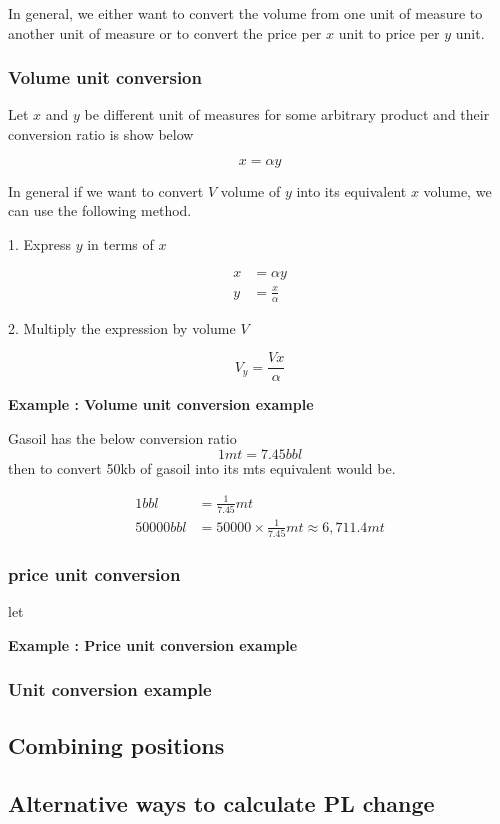 \documentclass{article}
\begin{document}
In general, we either want to convert the volume from one unit of measure to another unit of measure or to convert the price per $x$ unit to price per $y$ unit.

\subsubsection{Volume unit conversion}

Let $x$ and $y$ be different unit of measures for some arbitrary product and their conversion ratio is show below

$$
x = \alpha y
$$

In general if we want to convert $V$ volume of $y$ into its equivalent $x$ volume, we can use the following method. 

1. Express $y$ in terms of $x$


\begin{equation*}
    \begin{aligned}
        x &= \alpha y \\
        y &= \frac{x}{\alpha}
    \end{aligned}    
\end{equation*}

2. Multiply the expression by volume $V$ 

$$
V_y = \frac{Vx}{\alpha}
$$


\textbf{Example : Volume unit conversion example}

Gasoil has the below conversion ratio $$1mt = 7.45bbl$$ then to convert 50kb of gasoil into its mts equivalent would be.

\begin{equation*}
    \begin{aligned}
        1bbl & = \frac{1}{7.45}mt \\ 
        50000bbl & = 50000 \times \frac{1}{7.45}mt \approx 6,711.4mt
    \end{aligned}    
\end{equation*}

\subsubsection{price unit conversion}

let



\textbf{Example : Price unit conversion example}


\subsubsection{Unit conversion example}



\subsection{Combining positions}


\subsection{Alternative ways to calculate PL change}
\end{document}
